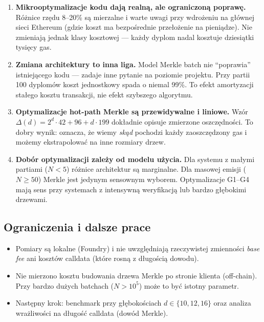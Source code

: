 \documentclass[11pt,a4paper]{article}
\begin{document}
\begin{enumerate}
  \item \textbf{Mikrooptymalizacje kodu dają realną, ale ograniczoną poprawę.}
        Różnice rzędu 8--20\% są mierzalne i warte uwagi przy wdrożeniu
        na głównej sieci Ethereum (gdzie koszt ma bezpośrednie przełożenie
        na pieniądze). Nie zmieniają jednak klasy kosztowej --- każdy dyplom
        nadal kosztuje dziesiątki tysięcy gas.

  \item \textbf{Zmiana architektury to inna liga.}
        Model Merkle batch nie ``poprawia'' istniejącego kodu ---
        zadaje inne pytanie na poziomie projektu.
        Przy partii 100 dyplomów koszt jednostkowy spada o niemal 99\%.
        To efekt amortyzacji stałego kosztu transakcji, nie efekt szybszego algorytmu.

  \item \textbf{Optymalizacje hot-path Merkle są przewidywalne i liniowe.}
        Wzór $\Delta(d) = 2^d \cdot 42 + 96 + d \cdot 199$ dokładnie opisuje
        zmierzone oszczędności. To dobry wynik: oznacza, że wiemy \emph{skąd}
        pochodzi każdy zaoszczędzony gas i możemy ekstrapolować na inne rozmiary drzew.

  \item \textbf{Dobór optymalizacji zależy od modelu użycia.}
        Dla systemu z małymi partiami ($N < 5$) różnice architektur są marginalne.
        Dla masowej emisji ($N \geq 50$) Merkle jest jedynym sensownym wyborem.
        Optymalizacje G1--G4 mają sens przy systemach z intensywną weryfikacją
        lub bardzo głębokimi drzewami.
\end{enumerate}

\subsection{Ograniczenia i dalsze prace}

\begin{itemize}
  \item Pomiary są lokalne (Foundry) i nie uwzględniają rzeczywistej zmienności
        \textit{base fee} ani kosztów calldata (które rosną z długością dowodu).
  \item Nie mierzono kosztu budowania drzewa Merkle po stronie klienta (off-chain).
        Przy bardzo dużych batchach ($N > 10^5$) może to być istotny parametr.
  \item Następny krok: benchmark przy głębokościach $d \in \{10, 12, 16\}$
        oraz analiza wrażliwości na długość calldata (dowód Merkle).
\end{itemize}
\end{document}
